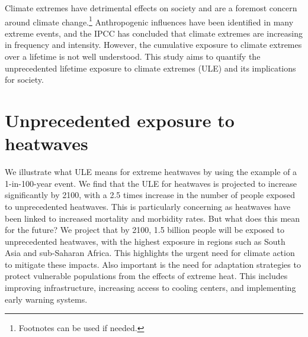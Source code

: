 \documentclass[9pt, twoside]{extarticle}
\begin{document}
\titleblock

\begin{maintext}


Climate extremes have detrimental effects on society and are a foremost concern around climate change.\footnote{Footnotes can be used if needed.} Anthropogenic influences have been identified in many extreme events, and the IPCC has concluded that climate extremes are increasing in frequency and intensity.\cite{IPCC2021} However, the cumulative exposure to climate extremes over a lifetime is not well understood. This study aims to quantify the unprecedented lifetime exposure to climate extremes (ULE) and its implications for society.


\section*{Unprecedented exposure to heatwaves}
We illustrate what ULE means for extreme heatwaves by using the example of a 1-in-100-year event. We find that the ULE for heatwaves is projected to increase significantly by 2100, with a 2.5 times increase in the number of people exposed to unprecedented heatwaves.\cite{Grant2025} This is particularly concerning as heatwaves have been linked to increased mortality and morbidity rates. But what does this mean for the future? We project that by 2100, 1.5 billion people will be exposed to unprecedented heatwaves, with the highest exposure in regions such as South Asia and sub-Saharan Africa.\cite{Grant2025} This highlights the urgent need for climate action to mitigate these impacts. Also important is the need for adaptation strategies to protect vulnerable populations from the effects of extreme heat. This includes improving infrastructure, increasing access to cooling centers, and implementing early warning systems.\cite{IPCC2021}


\end{maintext}
\end{document}
